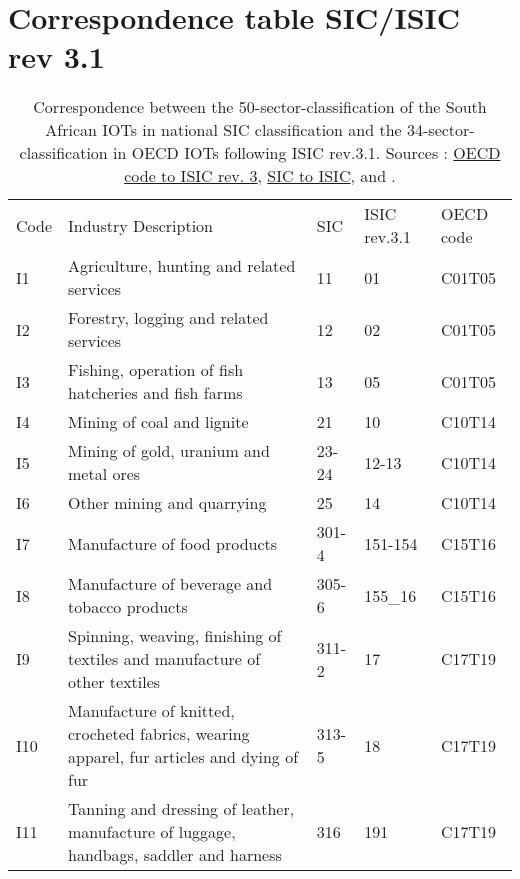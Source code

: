 \documentclass[12pt,english]{article}
\begin{document}
\section{Correspondence table SIC/ISIC rev 3.1}
\begin{table}[ht]
	\centering
	\vspace{-36pt}\hspace{-10pt}\caption{\label{correspondance_OECD_ZA}\footnotesize Correspondence between the 50-sector-classification of the South African IOTs in national SIC classification and the 34-sector-classification in OECD IOTs following ISIC rev.3.1. Sources : \href{http://www.oecd.org/sti/ind/IOT_Industries_Items.pdf}{OECD code to ISIC rev. 3}, \href{https://www.statssa.gov.za/additional_services/sic/descrip6.htm}{SIC to ISIC}, \cite{IOT2014} and .}
	\vspace{8pt}%
	\begin{adjustbox}{width=\textwidth}
	\normalsize
		\begin{tabular}{lp{500pt}lll}
		\toprule
		Code & Industry Description & SIC & ISIC rev.3.1 & OECD code \\ \arrayrulecolor{black!30}\midrule
		I1 & Agriculture, hunting and related services & 11 & 01 & C01T05 \\ \midrule
		I2 & Forestry, logging and related services & 12 & 02 & C01T05 \\ \midrule
		I3 & Fishing, operation of fish hatcheries and fish farms & 13 & 05 & C01T05 \\ \midrule
		I4 & Mining of coal and lignite & 21 & 10 & C10T14 \\ \midrule
		I5 & Mining of gold, uranium and metal ores  & 23-24 & 12-13 & C10T14 \\ \midrule
		I6 & Other mining and quarrying & 25 & 14 & C10T14 \\ \midrule
		I7 & Manufacture of food products & 301-4 & 151-154 & C15T16 \\ \midrule
		I8 & Manufacture of beverage and tobacco products & 305-6 & 155\_16 & C15T16 \\ \midrule
		I9 & Spinning, weaving, finishing of textiles and manufacture of other textiles & 311-2 & 17 & C17T19 \\ \midrule
		I10 & Manufacture of knitted, crocheted fabrics, wearing apparel, fur articles and dying of fur & 313-5 & 18 & C17T19 \\ \midrule
		I11 & Tanning and dressing of leather, manufacture of luggage, handbags, saddler and harness & 316 & 191 & C17T19 \\ \midrule

\end{tabular}
\end{adjustbox}
\end{table}
\end{document}
